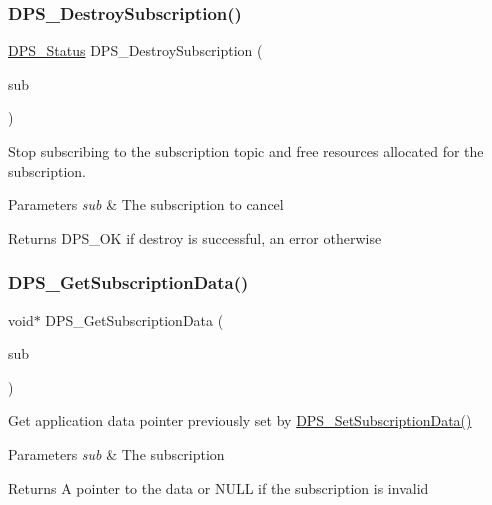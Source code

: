 \subsubsection{\texorpdfstring{D\+P\+S\+\_\+\+Destroy\+Subscription()}{DPS\_DestroySubscription()}}
{\footnotesize\ttfamily \hyperlink{group__status_ga30395a84d3cad9d4ec29848106415038}{D\+P\+S\+\_\+\+Status} D\+P\+S\+\_\+\+Destroy\+Subscription (\begin{DoxyParamCaption}\item[{\hyperlink{group__subscription_gadb927c4c1b7306867a75fc4288b54af7}{D\+P\+S\+\_\+\+Subscription} $\ast$}]{sub }\end{DoxyParamCaption})}



Stop subscribing to the subscription topic and free resources allocated for the subscription. 


\begin{DoxyParams}{Parameters}
{\em sub} & The subscription to cancel\\
\hline
\end{DoxyParams}
\begin{DoxyReturn}{Returns}
D\+P\+S\+\_\+\+OK if destroy is successful, an error otherwise 
\end{DoxyReturn}
\mbox{\label{group__subscription_ga88ab2284734f099ef67bcc60997142b3}} 
\subsubsection{\texorpdfstring{D\+P\+S\+\_\+\+Get\+Subscription\+Data()}{DPS\_GetSubscriptionData()}}
{\footnotesize\ttfamily void$\ast$ D\+P\+S\+\_\+\+Get\+Subscription\+Data (\begin{DoxyParamCaption}\item[{\hyperlink{group__subscription_gadb927c4c1b7306867a75fc4288b54af7}{D\+P\+S\+\_\+\+Subscription} $\ast$}]{sub }\end{DoxyParamCaption})}



Get application data pointer previously set by \hyperlink{group__subscription_gad581d341003e20c714061e44b57c2009}{D\+P\+S\+\_\+\+Set\+Subscription\+Data()} 


\begin{DoxyParams}{Parameters}
{\em sub} & The subscription\\
\hline
\end{DoxyParams}
\begin{DoxyReturn}{Returns}
A pointer to the data or N\+U\+LL if the subscription is invalid 
\end{DoxyReturn}
\mbox{\label{group__subscription_gad581d341003e20c714061e44b57c2009}} 
